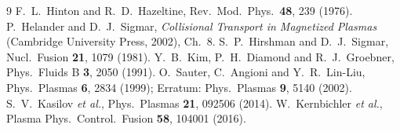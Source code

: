 \documentclass[11pt]{article}
\begin{document}
\begin{thebibliography}{9}
 F.~L.~Hinton and R.~D.~Hazeltine,
  Rev.\ Mod.\ Phys.\ \textbf{48}, 239 (1976).
 P.~Helander and D.~J.~Sigmar,
  \emph{Collisional Transport in Magnetized Plasmas} (Cambridge University
  Press, 2002), Ch.~8.
 S.~P.~Hirshman and D.~J.~Sigmar,
  Nucl.\ Fusion \textbf{21}, 1079 (1981).
 Y.~B.~Kim, P.~H.~Diamond and
  R.~J.~Groebner, Phys.\ Fluids B \textbf{3}, 2050 (1991).
 O.~Sauter, C.~Angioni and Y.~R.~Lin-Liu,
  Phys.\ Plasmas \textbf{6}, 2834 (1999); Erratum: Phys.\ Plasmas
  \textbf{9}, 5140 (2002).
 S.~V.~Kasilov \emph{et al.},
  Phys.\ Plasmas \textbf{21}, 092506 (2014).
 W.~Kernbichler \emph{et al.},
  Plasma Phys.\ Control.\ Fusion \textbf{58}, 104001 (2016).
\end{thebibliography}
\end{document}
